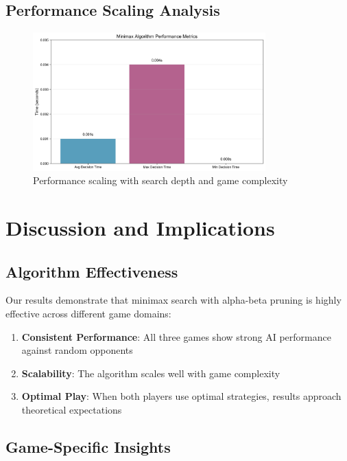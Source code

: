 \documentclass[12pt]{article}
\begin{document}
\subsection{Performance Scaling Analysis}

\begin{figure}[H]
\centering
\includegraphics[width=0.8\textwidth]{output/performance_metrics.png}
\caption{Performance scaling with search depth and game complexity}
\label{fig:performance_scaling}
\end{figure}

\section{Discussion and Implications}

\subsection{Algorithm Effectiveness}

Our results demonstrate that minimax search with alpha-beta pruning is highly effective across different game domains:

\begin{enumerate}
    \item \textbf{Consistent Performance}: All three games show strong AI performance against random opponents
    \item \textbf{Scalability}: The algorithm scales well with game complexity
    \item \textbf{Optimal Play}: When both players use optimal strategies, results approach theoretical expectations
\end{enumerate}

\subsection{Game-Specific Insights}
\end{document}
